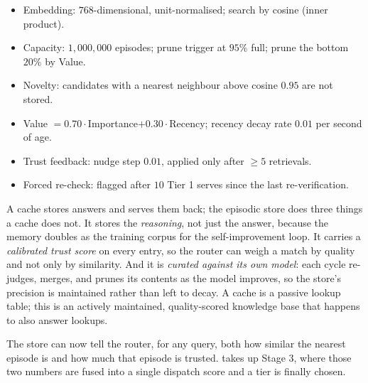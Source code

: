 \begin{bythenumbers}
\begin{itemize}[leftmargin=1.3em, itemsep=1pt]
  \item Embedding: $768$-dimensional, unit-normalised; search by cosine (inner product).
  \item Capacity: $1{,}000{,}000$ episodes; prune trigger at $95\%$ full; prune the bottom $20\%$ by Value.
  \item Novelty: candidates with a nearest neighbour above cosine $0.95$ are not stored.
  \item Value $= 0.70\cdot$Importance$+0.30\cdot$Recency; recency decay rate $0.01$ per second of age.
  \item Trust feedback: nudge step $0.01$, applied only after $\geq 5$ retrievals.
  \item Forced re-check: flagged after $10$ Tier 1 serves since the last re-verification.
\end{itemize}
\end{bythenumbers}

\begin{defence}
A cache stores answers and serves them back; the episodic store does three things a
cache does not. It stores the \emph{reasoning}, not just the answer, because the memory
doubles as the training corpus for the self-improvement loop. It carries a
\emph{calibrated trust score} on every entry, so the router can weigh a match by quality
and not only by similarity. And it is \emph{curated against its own model}: each cycle
re-judges, merges, and prunes its contents as the model improves, so the store's
precision is maintained rather than left to decay. A cache is a passive lookup table;
this is an actively maintained, quality-scored knowledge base that happens to also
answer lookups.
\end{defence}

The store can now tell the router, for any query, both how similar the nearest episode
is and how much that episode is trusted.  takes up Stage 3, where those
two numbers are fused into a single dispatch score and a tier is finally chosen.
